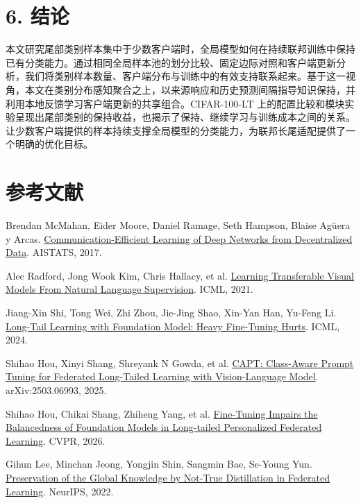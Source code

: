 \documentclass[UTF8,a4paper,10pt,fontset=fandol]{ctexart}
\begin{document}
\section*{6. 结论}

本文研究尾部类别样本集中于少数客户端时，全局模型如何在持续联邦训练中保持已有分类能力。通过相同全局样本池的划分比较、固定边际对照和客户端更新分析，我们将类别样本数量、客户端分布与训练中的有效支持联系起来。基于这一视角，本文在类别分布感知聚合之上，以来源响应和历史预测间隔指导知识保持，并利用本地反馈学习客户端更新的共享组合。CIFAR-100-LT 上的配置比较和模块实验呈现出尾部类别的保持收益，也揭示了保持、继续学习与训练成本之间的关系。让少数客户端提供的样本持续支撑全局模型的分类能力，为联邦长尾适配提供了一个明确的优化目标。


\section*{参考文献}

{\small\noindent [1] Brendan McMahan, Eider Moore, Daniel Ramage, Seth Hampson, Blaise Agüera y Arcas. \href{https://proceedings.mlr.press/v54/mcmahan17a.html}{Communication-Efficient Learning of Deep Networks from Decentralized Data}. AISTATS, 2017.\par}

{\small\noindent [2] Alec Radford, Jong Wook Kim, Chris Hallacy, et al. \href{https://proceedings.mlr.press/v139/radford21a.html}{Learning Transferable Visual Models From Natural Language Supervision}. ICML, 2021.\par}

{\small\noindent [3] Jiang-Xin Shi, Tong Wei, Zhi Zhou, Jie-Jing Shao, Xin-Yan Han, Yu-Feng Li. \href{https://proceedings.mlr.press/v235/shi24g.html}{Long-Tail Learning with Foundation Model: Heavy Fine-Tuning Hurts}. ICML, 2024.\par}

{\small\noindent [4] Shihao Hou, Xinyi Shang, Shreyank N Gowda, et al. \href{https://arxiv.org/abs/2503.06993}{CAPT: Class-Aware Prompt Tuning for Federated Long-Tailed Learning with Vision-Language Model}. arXiv:2503.06993, 2025.\par}

{\small\noindent [5] Shihao Hou, Chikai Shang, Zhiheng Yang, et al. \href{https://arxiv.org/abs/2605.02247}{Fine-Tuning Impairs the Balancedness of Foundation Models in Long-tailed Personalized Federated Learning}. CVPR, 2026.\par}

{\small\noindent [6] Gihun Lee, Minchan Jeong, Yongjin Shin, Sangmin Bae, Se-Young Yun. \href{https://proceedings.neurips.cc/paper_files/paper/2022/hash/fadec8f2e65f181d777507d1df69b92f-Abstract-Conference.html}{Preservation of the Global Knowledge by Not-True Distillation in Federated Learning}. NeurIPS, 2022.\par}
\end{document}
